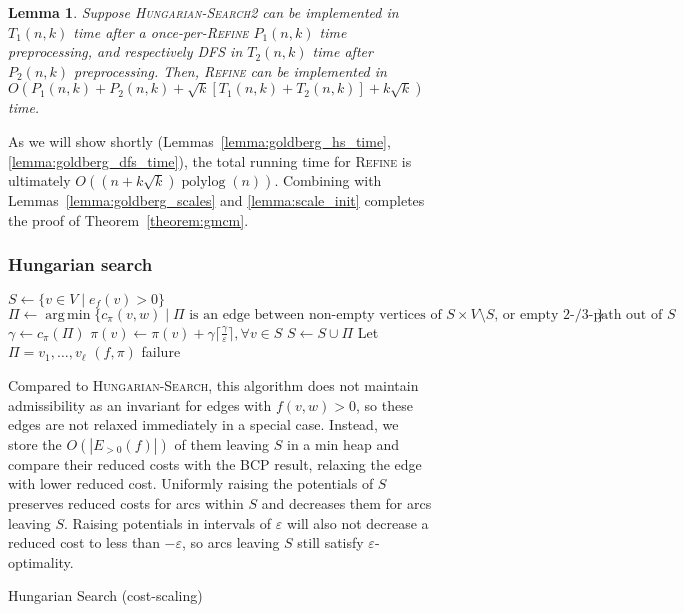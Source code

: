 \documentclass[11pt]{article}
\def\polylog{\mathop{\mathrm{polylog}}}
\def\eps{\varepsilon}
\DeclareMathOperator*{\argmin}{arg\,min}
\theoremstyle{plain}
\newtheorem{lemma}{Lemma}
\begin{document}
\begin{figure*}
\begin{lemma}
Suppose \textsc{Hungarian-Search2} can be implemented in $T_1(n, k)$ time after
a once-per-\textsc{Refine} $P_1(n, k)$ time preprocessing, and respectively
\textsc{DFS} in $T_2(n, k)$ time after $P_2(n, k)$ preprocessing.
Then, \textsc{Refine} can be implemented in
$O(P_1(n, k) + P_2(n, k) + \sqrt{k}[T_1(n, k) + T_2(n, k)] + k\sqrt{k})$ time.
\end{lemma}

As we will show shortly (Lemmas~\ref{lemma:goldberg_hs_time},
\ref{lemma:goldberg_dfs_time}), the total running time for \textsc{Refine}
is ultimately $O((n + k\sqrt{k})\polylog(n))$.
Combining with Lemmas~\ref{lemma:goldberg_scales} and \ref{lemma:scale_init}
completes the proof of Theorem~\ref{theorem:gmcm}.

\subsubsection{Hungarian search}

\begin{algorithm}
\caption{Hungarian Search (cost-scaling)}
\begin{algorithmic}[1]
	\State $S \gets \{v \in V \mid e_f(v) > 0\}$
	\Repeat
		\State $\Pi \gets \argmin\{c_\pi(v, w) \mid \text{$\Pi$ is an edge between non-empty vertices of $S \times V \setminus S$, or empty 2-/3-path out of $S$}\}$
		\State $\gamma \gets c_\pi(\Pi)$
			\State $\pi(v) \gets \pi(v) + \gamma\lceil\frac{\gamma}{\eps}\rceil, \forall v \in S$
		\EndIf
		\State $S \gets S \cup \Pi$
		\Statex %
		\State Let $\Pi = v_1, \ldots, v_\ell$
		 
			\State\Return $(f, \pi)$
		\EndIf
	\State\Return failure
\EndFunction
\end{algorithmic}
\end{algorithm}

Compared to \textsc{Hungarian-Search}, this algorithm does not maintain
admissibility as an invariant for edges with $f(v, w) > 0$, so these edges are
not relaxed immediately in a special case.
Instead, we store the $O(|E_{>0}(f)|)$ of them leaving $S$ in a min heap and
compare their reduced costs with the BCP result, relaxing the edge with lower
reduced cost.
Uniformly raising the potentials of $S$ preserves reduced costs for arcs within
$S$ and decreases them for arcs leaving $S$.
Raising potentials in intervals of $\eps$ will also not decrease a reduced
cost to less than $-\eps$, so arcs leaving $S$ still satisfy $\eps$-optimality.


\end{figure*}
\end{document}

